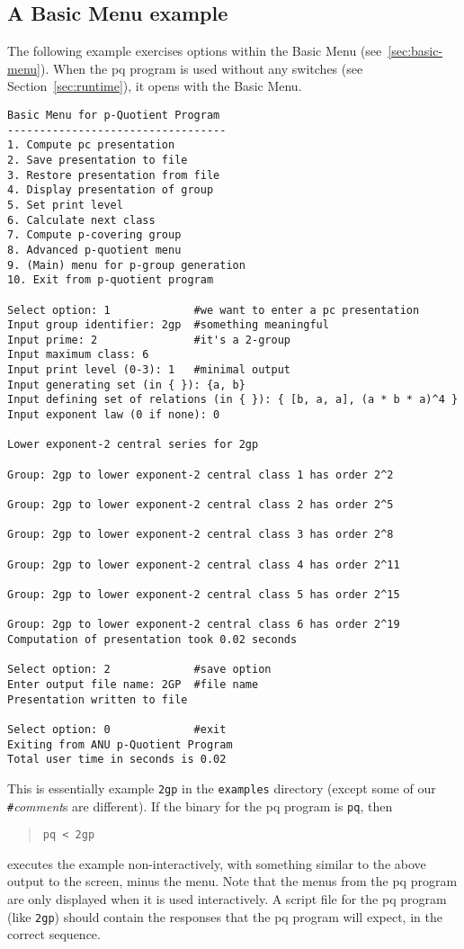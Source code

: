\documentclass[12pt]{article}
\begin{document}
\subsection{A Basic Menu example}
The following example exercises options within the Basic Menu
(see~\ref{sec:basic-menu}). When the pq program is used without any switches
(see Section~\ref{sec:runtime}), it opens with the Basic Menu.
\begin{verbatim}
Basic Menu for p-Quotient Program
----------------------------------
1. Compute pc presentation
2. Save presentation to file
3. Restore presentation from file
4. Display presentation of group
5. Set print level
6. Calculate next class
7. Compute p-covering group
8. Advanced p-quotient menu
9. (Main) menu for p-group generation
10. Exit from p-quotient program

Select option: 1             #we want to enter a pc presentation
Input group identifier: 2gp  #something meaningful
Input prime: 2               #it's a 2-group
Input maximum class: 6
Input print level (0-3): 1   #minimal output
Input generating set (in { }): {a, b}
Input defining set of relations (in { }): { [b, a, a], (a * b * a)^4 }
Input exponent law (0 if none): 0

Lower exponent-2 central series for 2gp

Group: 2gp to lower exponent-2 central class 1 has order 2^2

Group: 2gp to lower exponent-2 central class 2 has order 2^5

Group: 2gp to lower exponent-2 central class 3 has order 2^8

Group: 2gp to lower exponent-2 central class 4 has order 2^11

Group: 2gp to lower exponent-2 central class 5 has order 2^15

Group: 2gp to lower exponent-2 central class 6 has order 2^19
Computation of presentation took 0.02 seconds

Select option: 2             #save option
Enter output file name: 2GP  #file name
Presentation written to file

Select option: 0             #exit
Exiting from ANU p-Quotient Program
Total user time in seconds is 0.02
\end{verbatim}

This is essentially example \texttt{2gp} in the \texttt{examples} directory
(except some of our \texttt{\#}\textit{comment}s are different).
If the binary for the pq program is \texttt{pq}, then
\begin{quote}
 \verb|pq < 2gp|
\end{quote}
executes the example non-interactively, with something similar to the above
output to the screen, minus the menu. Note that
the menus from the pq program are only displayed when it is used interactively.
A script file for the pq program (like \texttt{2gp}) should contain the
responses that the pq program will expect, in the correct sequence.
\end{document}
